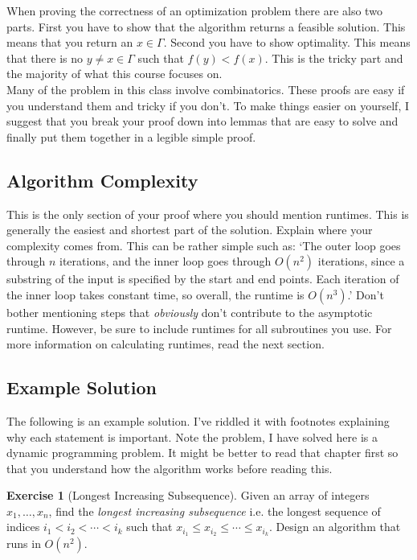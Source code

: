 \documentclass[11pt]{article}
\theoremstyle{plain}
\theoremstyle{definition}
\newtheorem{exer}[thm]{Exercise}
\numberwithin{equation}{section}
\numberwithin{figure}{section}
\begin{document}
\noindent When proving the correctness of an optimization problem there are also two parts. First you have to show that the algorithm returns a feasible solution. This means that you return an $x \in \Gamma$. Second you have to show optimality. This means that there is no $y \neq x \in \Gamma$ such that $f(y) < f(x)$. This is the tricky part and the majority of what this course focuses on. \\

\noindent Many of the problem in this class involve combinatorics. These proofs are easy if you understand them and tricky if you don't. To make things easier on yourself, I suggest that you break your proof down into lemmas that are easy to solve and finally put them together in a legible simple proof.

\subsection{Algorithm Complexity}
This is the only section of your proof where you should mention runtimes. This is generally the easiest and shortest part of the solution. Explain where your complexity comes from. This can be rather simple such as: `The outer loop goes through $n$ iterations, and the inner loop goes through $O(n^2)$ iterations, since a substring of the input is specified by the start and end points. Each iteration of the inner loop takes constant time, so overall, the runtime is $O(n^3)$.' Don't bother mentioning steps that \emph{obviously} don't contribute to the asymptotic runtime. However, be sure to include runtimes for all subroutines you use. For more information on calculating runtimes, read the next section.


\subsection{Example Solution}
The following is an example solution. I've riddled it with footnotes explaining why each statement is important. Note the problem, I have solved here is a dynamic programming problem. It might be better to read that chapter first so that you understand how the algorithm works before reading this.

\begin{exer}[Longest Increasing Subsequence]
Given an array of integers $x_1, \ldots, x_n$, find the \emph{longest increasing subsequence} i.e. the longest sequence of indices $i_1 < i_2 < \cdots < i_k$ such that $x_{i_1} \leq x_{i_2} \leq \cdots \leq x_{i_k}$. Design an algorithm that runs in $O(n^2)$.
\end{exer}
\end{document}
